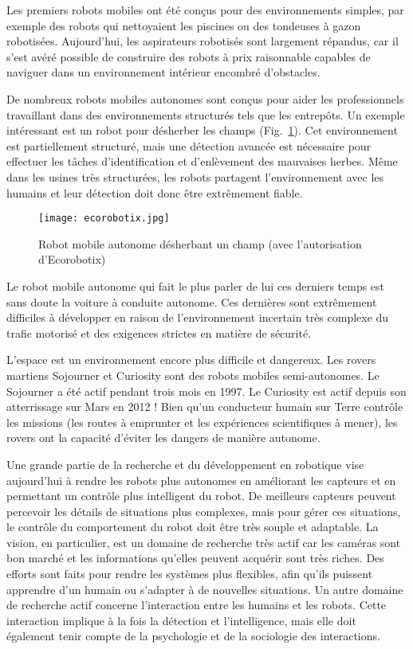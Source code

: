 Les premiers robots mobiles ont été conçus pour des environnements simples, par exemple des robots qui nettoyaient les piscines ou des tondeuses à gazon robotisées. Aujourd'hui, les aspirateurs robotisés sont largement répandus, car il s'est avéré possible de construire des robots à prix raisonnable capables de naviguer dans un environnement intérieur encombré d'obstacles.

De nombreux robots mobiles autonomes sont conçus pour aider les professionnels travaillant dans des environnements structurés tels que les entrepôts. Un exemple intéressant est un robot pour désherber les champs (Fig.~\ref{fig.agri_robot}). Cet environnement est partiellement structuré, mais une détection avancée est nécessaire pour effectuer les tâches d'identification et d'enlèvement des mauvaises herbes. Même dans les usines très structurées, les robots partagent l'environnement avec les humains et leur détection doit donc être extrêmement fiable.

\begin{figure}
\begin{center}
\texttt{[image: ecorobotix.jpg]}
\end{center}
\caption{Robot mobile autonome désherbant un champ (avec l'autorisation d'Ecorobotix)}
\label{fig.agri_robot}
\end{figure}

Le robot mobile autonome qui fait le plus parler de lui ces derniers temps est sans doute la voiture à conduite autonome. Ces dernières sont extrêmement difficiles à développer en raison de l'environnement incertain très complexe du trafic motorisé et des exigences strictes en matière de sécurité.

L'espace est un environnement encore plus difficile et dangereux. Les rovers martiens Sojourner et Curiosity sont des robots mobiles semi-autonomes. Le Sojourner a été actif pendant trois mois en 1997. Le Curiosity est actif depuis son atterrissage sur Mars en 2012 ! Bien qu'un conducteur humain sur Terre contrôle les missions (les routes à emprunter et les expériences scientifiques à mener), les rovers ont la capacité d'éviter les dangers de manière autonome.

Une grande partie de la recherche et du développement en robotique vise aujourd'hui à rendre les robots plus autonomes en améliorant les capteurs et en permettant un contrôle plus intelligent du robot. De meilleurs capteurs peuvent percevoir les détails de situations plus complexes, mais pour gérer ces situations, le contrôle du comportement du robot doit être très souple et adaptable. La vision, en particulier, est un domaine de recherche très actif car les caméras sont bon marché et les informations qu'elles peuvent acquérir sont très riches. Des efforts sont faits pour rendre les systèmes plus flexibles, afin qu'ils puissent apprendre d'un humain ou s'adapter à de nouvelles situations. Un autre domaine de recherche actif concerne l'interaction entre les humains et les robots. Cette interaction implique à la fois la détection et l'intelligence, mais elle doit également tenir compte de la psychologie et de la sociologie des interactions.

